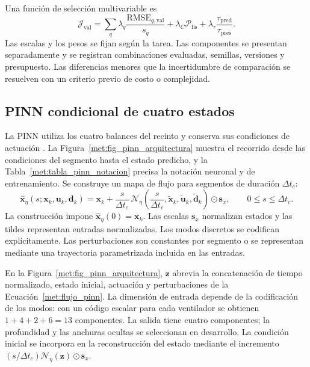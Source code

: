Una función de selección multivariable es
\begin{equation}
\mathcal J_{\mathrm{val}}=\sum_q\lambda_q\frac{\mathrm{RMSE}_{q,\mathrm{val}}}{s_q}
+\lambda_C\mathcal P_{\mathrm{fis}}+\lambda_\tau\frac{\tau_{\mathrm{pred}}}{\tau_{\mathrm{pres}}}.
\label{met:seleccion_ml}
\end{equation}
Las escalas y los pesos se fijan según la tarea. Las componentes se presentan separadamente y se registran combinaciones evaluadas, semillas, versiones y presupuesto. Las diferencias menores que la incertidumbre de comparación se resuelven con un criterio previo de costo o complejidad.

\subsection{PINN condicional de cuatro estados}
\label{met:pinn}

La PINN utiliza los cuatro balances del recinto y conserva sus condiciones de actuación \cite{raissi2019}. La Figura~\ref{met:fig_pinn_arquitectura} muestra el recorrido desde las condiciones del segmento hasta el estado predicho, y la Tabla~\ref{met:tabla_pinn_notacion} precisa la notación neuronal y de entrenamiento. Se construye un mapa de flujo para segmentos de duración $\Delta t_c$:
\begin{equation}
\widehat{\mathbf x}_\eta(s;\mathbf x_k,\mathbf u_k,\mathbf d_k)
=\mathbf x_k+\frac{s}{\Delta t_c}\,
\mathcal N_\eta\left(\frac{s}{\Delta t_c},\widetilde{\mathbf x}_k,
\widetilde{\mathbf u}_k,\widetilde{\mathbf d}_k\right)\odot\mathbf s_x,
\qquad 0\leq s\leq\Delta t_c.
\label{met:flujo_pinn}
\end{equation}
La construcción impone $\widehat{\mathbf x}_\eta(0)=\mathbf x_k$. Las escalas $\mathbf s_x$ normalizan estados y las tildes representan entradas normalizadas. Los modos discretos se codifican explícitamente. Las perturbaciones son constantes por segmento o se representan mediante una trayectoria parametrizada incluida en las entradas.

En la Figura~\ref{met:fig_pinn_arquitectura}, $\mathbf z$ abrevia la concatenación de tiempo normalizado, estado inicial, actuación y perturbaciones de la Ecuación~\ref{met:flujo_pinn}. La dimensión de entrada depende de la codificación de los modos: con un código escalar para cada ventilador se obtienen $1+4+2+6=13$ componentes. La salida tiene cuatro componentes; la profundidad y las anchuras ocultas se seleccionan en desarrollo. La condición inicial se incorpora en la reconstrucción del estado mediante el incremento $(s/\Delta t_c)\mathcal N_\eta(\mathbf z)\odot\mathbf s_x$.

